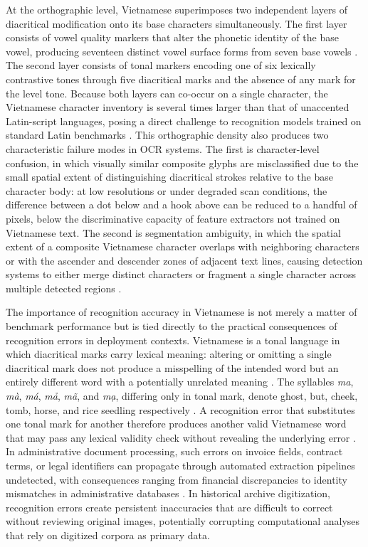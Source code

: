 At the orthographic level, Vietnamese superimposes two independent layers of diacritical modification onto its base characters simultaneously. The first layer consists of vowel quality markers that alter the phonetic identity of the base vowel, producing seventeen distinct vowel surface forms from seven base vowels \cite{Nguyen2012}. The second layer consists of tonal markers encoding one of six lexically contrastive tones through five diacritical marks and the absence of any mark for the level tone. Because both layers can co-occur on a single character, the Vietnamese character inventory is several times larger than that of unaccented Latin-script languages, posing a direct challenge to recognition models trained on standard Latin benchmarks \cite{Nguyen2021}. This orthographic density also produces two characteristic failure modes in OCR systems. The first is character-level confusion, in which visually similar composite glyphs are misclassified due to the small spatial extent of distinguishing diacritical strokes relative to the base character body: at low resolutions or under degraded scan conditions, the difference between a dot below and a hook above can be reduced to a handful of pixels, below the discriminative capacity of feature extractors not trained on Vietnamese text. The second is segmentation ambiguity, in which the spatial extent of a composite Vietnamese character overlaps with neighboring characters or with the ascender and descender zones of adjacent text lines, causing detection systems to either merge distinct characters or fragment a single character across multiple detected regions \cite{Nguyen2021}.

The importance of recognition accuracy in Vietnamese is not merely a matter of benchmark performance but is tied directly to the practical consequences of recognition errors in deployment contexts. Vietnamese is a tonal language in which diacritical marks carry lexical meaning: altering or omitting a single diacritical mark does not produce a misspelling of the intended word but an entirely different word with a potentially unrelated meaning \cite{Le2025}. The syllables \textit{ma}, \textit{m\`{a}}, \textit{m\'{a}}, \textit{m\h{a}}, \textit{m\~{a}}, and \textit{m\d{a}}, differing only in tonal mark, denote ghost, but, cheek, tomb, horse, and rice seedling respectively \cite{Nguyen2019}. A recognition error that substitutes one tonal mark for another therefore produces another valid Vietnamese word that may pass any lexical validity check without revealing the underlying error \cite{Pham2017}. In administrative document processing, such errors on invoice fields, contract terms, or legal identifiers can propagate through automated extraction pipelines undetected, with consequences ranging from financial discrepancies to identity mismatches in administrative databases \cite{Park2019}. In historical archive digitization, recognition errors create persistent inaccuracies that are difficult to correct without reviewing original images, potentially corrupting computational analyses that rely on digitized corpora as primary data.

